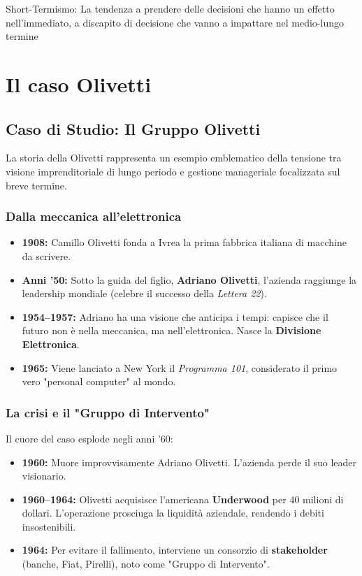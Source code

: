 \documentclass[a4paper,12pt]{article}
\begin{document}
	Short-Termismo: La tendenza a prendere delle decisioni che hanno un effetto nell'immediato, a discapito di decisione che vanno a impattare nel medio-lungo termine
	
	\section{Il caso Olivetti}
	\subsection{Caso di Studio: Il Gruppo Olivetti}
	La storia della Olivetti rappresenta un esempio emblematico della tensione tra visione imprenditoriale di lungo periodo e gestione manageriale focalizzata sul breve termine.
	
	\subsubsection{Dalla meccanica all'elettronica}
	\begin{itemize}
		\item \textbf{1908:} Camillo Olivetti fonda a Ivrea la prima fabbrica italiana di macchine da scrivere.
		\item \textbf{Anni '50:} Sotto la guida del figlio, \textbf{Adriano Olivetti}, l'azienda raggiunge la leadership mondiale (celebre il successo della \textit{Lettera 22}).
		\item \textbf{1954--1957:} Adriano ha una visione che anticipa i tempi: capisce che il futuro non è nella meccanica, ma nell'elettronica. Nasce la \textbf{Divisione Elettronica}.
		\item \textbf{1965:} Viene lanciato a New York il \textit{Programma 101}, considerato il primo vero "personal computer" al mondo.
	\end{itemize}
	
	\subsubsection{La crisi e il "Gruppo di Intervento"}
	Il cuore del caso esplode negli anni '60:
	\begin{itemize}
		\item \textbf{1960:} Muore improvvisamente Adriano Olivetti. L'azienda perde il suo leader visionario.
		\item \textbf{1960--1964:} Olivetti acquisisce l'americana \textbf{Underwood} per 40 milioni di dollari. L'operazione prosciuga la liquidità aziendale, rendendo i debiti insostenibili.
		\item \textbf{1964:} Per evitare il fallimento, interviene un consorzio di \textbf{stakeholder} (banche, Fiat, Pirelli), noto come "Gruppo di Intervento".
	\end{itemize}
	
\end{document}
